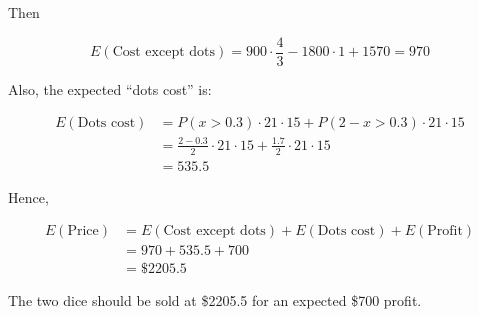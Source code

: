 \documentclass[a4paper, 11pt, twoside]{article}
\begin{document}
Then

\[E(\text{Cost except dots})=900\cdot \frac{4}{3} - 1800\cdot 1 + 1570=970\]

Also, the expected ``dots cost'' is:

\[
\begin{split}
	E(\text{Dots cost})&= P(x>0.3)\cdot 21\cdot 15 + P(2-x>0.3)\cdot 21\cdot 15\\
	&= \frac{2-0.3}{2}\cdot 21\cdot 15 + \frac{1.7}{2}\cdot 21\cdot 15\\
	&= 535.5
\end{split}
\]

Hence,

\[\begin{split}E(\text{Price}) &= E(\text{Cost except dots}) + E(\text{Dots cost}) + E(\text{Profit})\\&=970+535.5+700\\&=\$2205.5\end{split}\]	

The two dice should be sold at \$2205.5 for an expected \$700 profit. 
\end{document}
